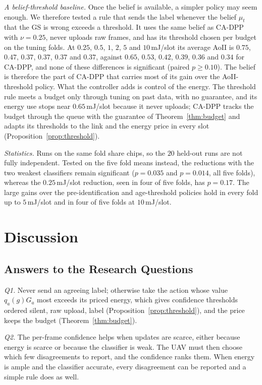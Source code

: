 \documentclass[5p,twocolumn]{elsarticle}
\theoremstyle{remark}
\begin{document}
\emph{A belief-threshold baseline.} Once the belief is available, a simpler policy may seem enough. We therefore tested a rule that sends the label whenever the belief $\mu_t$ that the GS is wrong exceeds a threshold. It uses the same belief as CA-DPP with $\nu=0.25$, never uploads raw frames, and has its threshold chosen per budget on the tuning folds. At $0.25$, $0.5$, $1$, $2$, $5$ and $10$\,mJ/slot its average AoII is $0.75$, $0.47$, $0.37$, $0.37$, $0.37$ and $0.37$, against $0.65$, $0.53$, $0.42$, $0.39$, $0.36$ and $0.34$ for CA-DPP, and none of these differences is significant (paired $p\ge0.10$). The belief is therefore the part of CA-DPP that carries most of its gain over the AoII-threshold policy. What the controller adds is control of the energy. The threshold rule meets a budget only through tuning on past data, with no guarantee, and its energy use stops near $0.65$\,mJ/slot because it never uploads; CA-DPP tracks the budget through the queue with the guarantee of Theorem~\ref{thm:budget} and adapts its thresholds to the link and the energy price in every slot (Proposition~\ref{prop:threshold}).

\emph{Statistics.} Runs on the same fold share chips, so the $20$ held-out runs are not fully independent. Tested on the five fold means instead, the reductions with the two weakest classifiers remain significant ($p=0.035$ and $p=0.014$, all five folds), whereas the $0.25$\,mJ/slot reduction, seen in four of five folds, has $p=0.17$. The large gains over the pre-identification and age-threshold policies hold in every fold up to $5$\,mJ/slot and in four of five folds at $10$\,mJ/slot.

\section{Discussion}\label{sec:discussion}
\subsection{Answers to the Research Questions}
\emph{Q1.} Never send an agreeing label; otherwise take the action whose value $q_a(g)G_a$ most exceeds its priced energy, which gives confidence thresholds ordered silent, raw upload, label (Proposition~\ref{prop:threshold}), and the price keeps the budget (Theorem~\ref{thm:budget}).

\emph{Q2.} The per-frame confidence helps when updates are scarce, either because energy is scarce or because the classifier is weak. The UAV must then choose which few disagreements to report, and the confidence ranks them. When energy is ample and the classifier accurate, every disagreement can be reported and a simple rule does as well.
\end{document}
